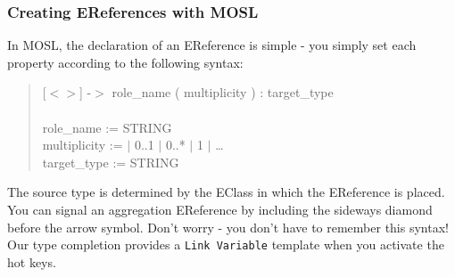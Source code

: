 \newpage
\subsubsection{Creating EReferences with MOSL}
\texHeader
\hypertarget{static:references tex}{}

In MOSL, the declaration of an EReference is simple - you simply set each property according to the following syntax:

{ \begin{quote} \small
[$<>$] -$>$ role\_name ( multiplicity ) :  target\_type \\
\\
role\_name := STRING \\
multiplicity := $|$ 0..1 $|$ 0..* $|$ 1 $|$ \ldots \\
target\_type := STRING \\
\end{quote} }

The source type is determined by the EClass in which the EReference is placed. You can signal an aggregation EReference by including the sideways diamond before
the arrow symbol. Don't worry - you don't have to remember this syntax! Our type completion provides a \texttt{Link Variable} template when you activate the hot
keys.

